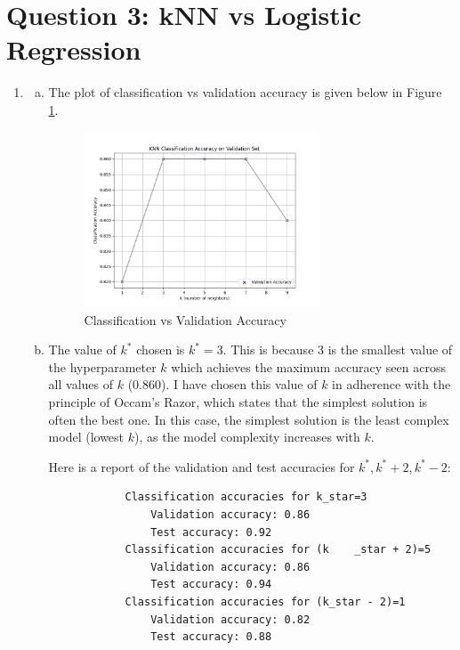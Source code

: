 \documentclass{article}
\begin{document}
\newpage
\section*{Question 3: kNN vs Logistic Regression}

\begin{enumerate}[3.1]
    \item \begin{enumerate}[(a)]
        \item The plot of classification vs validation accuracy is given below in Figure \ref{fig:q3a}.
        
        \begin{figure}[H]
            \centering
            \includegraphics[width=0.7\textwidth]{../figures/knn_classification_accuracy.png}
            \caption{Classification vs Validation Accuracy}
            \label{fig:q3a}
        \end{figure}
    
        \item The value of $k^*$ chosen is $k^* = 3$. This is because $3$ is the smallest value of the hyperparameter $k$ which achieves the maximum accuracy seen across all values of $k$ (0.860). I have chosen this value of $k$ in adherence with the principle of Occam's Razor, which states that the simplest solution is often the best one. In this case, the simplest solution is the least complex model (lowest $k$), as the model complexity increases with $k$. 
        
        Here is a report of the validation and test accuracies for $k^*, k^* + 2, k^* - 2$:
    
        \begin{verbatim}
            Classification accuracies for k_star=3
                Validation accuracy: 0.86
                Test accuracy: 0.92
            Classification accuracies for (k    _star + 2)=5
                Validation accuracy: 0.86
                Test accuracy: 0.94
            Classification accuracies for (k_star - 2)=1
                Validation accuracy: 0.82
                Test accuracy: 0.88
        \end{verbatim}
    

\end{enumerate}
\end{enumerate}
\end{document}
